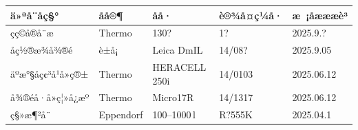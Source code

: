 \documentclass[UTF8,10pt,a4paper,fontset=fandol]{ctexart}
\newcommand{\fieldvalue}[1]{#1}
\newcommand{\handwritten}[1]{#1}
\begin{document}
\begin{tabularx}{\textwidth}{|X|X|X|X|X|}
\hline
ä»ªå¨åç§° & åå®¶ & åå· & è®¾å¤ç¼å· & æ ¡åæææè³
\\ \hline
çç©å®å¨æ &
\fieldvalue{Thermo} &
\fieldvalue{\handwritten{130?}} &
\fieldvalue{\handwritten{1?}} &
\fieldvalue{\handwritten{2025.9.?}}
\\ \hline
åç½®æ¾å¾®é &
\fieldvalue{è±å¡} &
\fieldvalue{Leica DmIL} &
\fieldvalue{\handwritten{14/08?}} &
\fieldvalue{\handwritten{2025.9.05}}
\\ \hline
äºæ°§åç¢³å¹å»ç®± &
\fieldvalue{Thermo} &
\fieldvalue{HERACELL 250i} &
\fieldvalue{\handwritten{14/0103}} &
\fieldvalue{\handwritten{2025.06.12}}
\\ \hline
å¾®éå·å»ç¦»å¿æº &
\fieldvalue{Thermo} &
\fieldvalue{Micro17R} &
\fieldvalue{\handwritten{14/1317}} &
\fieldvalue{\handwritten{2025.06.12}}
\\ \hline
ç§»æ¶²å¨ &
\fieldvalue{Eppendorf} &
\fieldvalue{\handwritten{100--1000\,\textmu l}} &
\fieldvalue{\handwritten{R?555K}} &
\fieldvalue{\handwritten{2025.04.1}}
\\ \hline
\end{tabularx}
\end{document}

